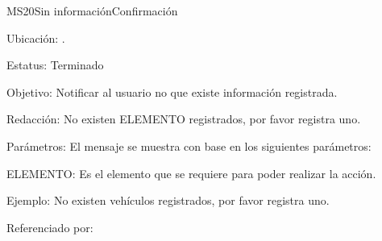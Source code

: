 \begin{mensaje}{MS20}{Sin información}{Confirmación}
	\item[Ubicación:] \msjEmergente.
	\item[Estatus:] Terminado
	\item[Objetivo:] Notificar al usuario no que existe información registrada.
	\item[Redacción:] No existen ELEMENTO registrados, por favor registra uno.
	\item[Parámetros:] El mensaje se muestra con base en los siguientes parámetros:
	\begin{Citemize} 
		\item ELEMENTO: Es el elemento que se requiere para poder realizar la acción.
	\end{Citemize}
	\item[Ejemplo:] No existen vehículos registrados, por favor registra uno.
	\item[Referenciado por:] 
\end{mensaje}